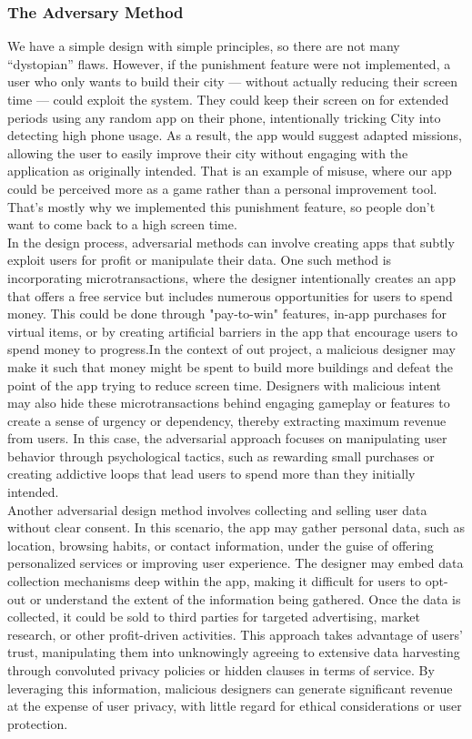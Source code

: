 \documentclass[sigconf, 11pt]{acmart}
\begin{document}
\subsubsection{The Adversary Method}
We have a simple design with simple principles, so there are not many “dystopian” flaws. However, if the punishment feature were not implemented, a user who only wants to build their city — without actually reducing their screen time — could exploit the system. They could keep their screen on for extended periods using any random app on their phone, intentionally tricking City into detecting high phone usage. As a result, the app would suggest adapted missions, allowing the user to easily improve their city without engaging with the application as originally intended. That is an example of misuse, where our app could be perceived more as a game rather than a personal improvement tool. That’s mostly why we implemented this punishment feature, so people don’t want to come back to a high screen time. 
\\

In the design process, adversarial methods can involve creating apps that subtly exploit users for profit or manipulate their data. One such method is incorporating microtransactions, where the designer intentionally creates an app that offers a free service but includes numerous opportunities for users to spend money. This could be done through "pay-to-win" features, in-app purchases for virtual items, or by creating artificial barriers in the app that encourage users to spend money to progress.In the context of out project, a malicious designer may make it such that money might be spent to build more buildings and defeat the point of the app trying to reduce screen time. Designers with malicious intent may also hide these microtransactions behind engaging gameplay or features to create a sense of urgency or dependency, thereby extracting maximum revenue from users. In this case, the adversarial approach focuses on manipulating user behavior through psychological tactics, such as rewarding small purchases or creating addictive loops that lead users to spend more than they initially intended.
\\

Another adversarial design method involves collecting and selling user data without clear consent. In this scenario, the app may gather personal data, such as location, browsing habits, or contact information, under the guise of offering personalized services or improving user experience. The designer may embed data collection mechanisms deep within the app, making it difficult for users to opt-out or understand the extent of the information being gathered. Once the data is collected, it could be sold to third parties for targeted advertising, market research, or other profit-driven activities. This approach takes advantage of users’ trust, manipulating them into unknowingly agreeing to extensive data harvesting through convoluted privacy policies or hidden clauses in terms of service. By leveraging this information, malicious designers can generate significant revenue at the expense of user privacy, with little regard for ethical considerations or user protection.
\\
\end{document}
